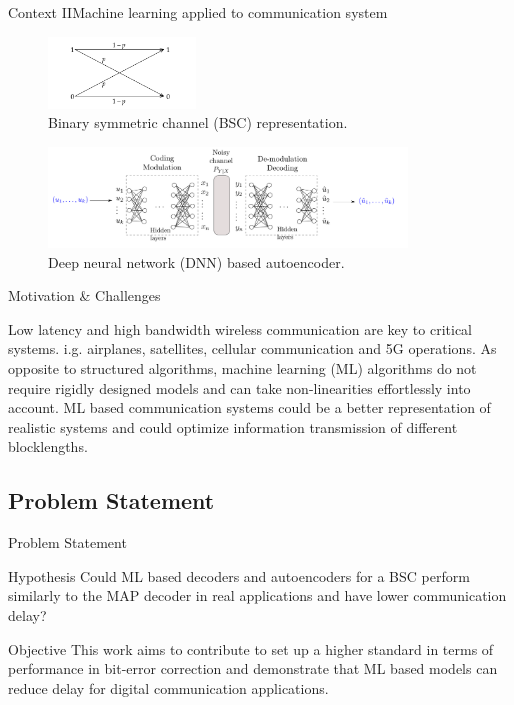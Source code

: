 \documentclass{beamer}
\begin{document}
\begin{frame}{Context II}{Machine learning applied to communication system}


  \begin{figure}
  \centering
   \includegraphics[width=0.35\textwidth]{images/BSC}
  \caption{Binary symmetric channel (BSC) representation.}%
\end{figure}


  \begin{figure}
  \centering
   \includegraphics[width=0.85\textwidth]{images/autoencoder}
  \caption{Deep neural network (DNN) based autoencoder.}%
\end{figure}

\end{frame}

\begin{frame}{Motivation \& Challenges}

\begin{outline}
 \1 Low latency and high bandwidth wireless communication are key to critical systems.
   \2 i.g. airplanes, satellites, cellular communication and 5G operations.
\pause
 \1 As opposite to structured algorithms, machine learning (ML) algorithms do not require rigidly designed models and can take non-linearities effortlessly into account.
\pause
 \1  ML based communication systems could be a better representation of realistic systems and could optimize information transmission of different blocklengths.
  
\end{outline} 
  
\end{frame}


\subsection{Problem Statement}
\begin{frame}{Problem Statement}

\begin{block}{Hypothesis}
Could ML based decoders and autoencoders for a BSC perform similarly to the MAP decoder in real applications and have lower communication delay?
\end{block}
\pause
\begin{block}{Objective}
This work aims to contribute to set up a higher standard in terms of performance in bit-error correction and demonstrate that ML based models can reduce delay for digital communication applications. 
\end{block}
\end{frame}
\end{document}
